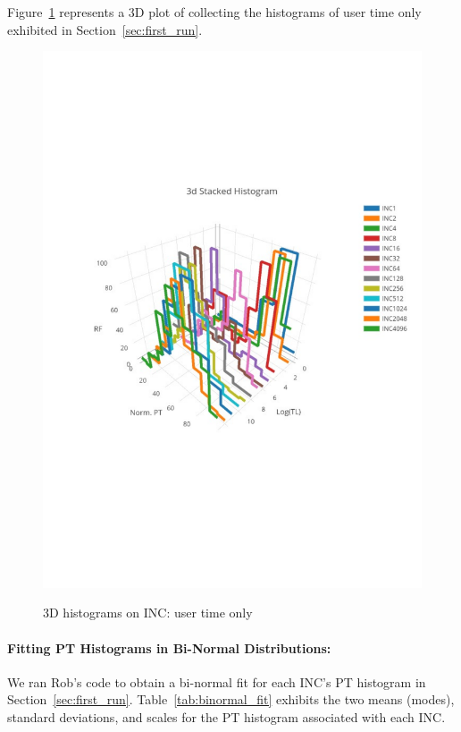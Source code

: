 \pagebreak
\clearpage
Figure~\ref{fig:hist3d_u} represents a 3D plot of collecting the histograms of user time only
exhibited in Section~\ref{sec:first_run}. 
\begin{figure}[htp!]
	\centering
	\includegraphics[scale=1]{u_s_time/3dplot_utime_only}\label{fig:3d_plot_u}
	\caption{3D histograms on INC: user time only~\label{fig:hist3d_u}}
\end{figure}

\clearpage
\pagebreak

\paragraph{Fitting PT Histograms in Bi-Normal Distributions:}
We ran Rob's code to obtain a bi-normal fit for each INC's PT histogram 
in Section~\ref{sec:first_run}. 
Table~\ref{tab:binormal_fit} exhibits the two means (modes), standard deviations, and scales for the PT histogram associated with each INC.

